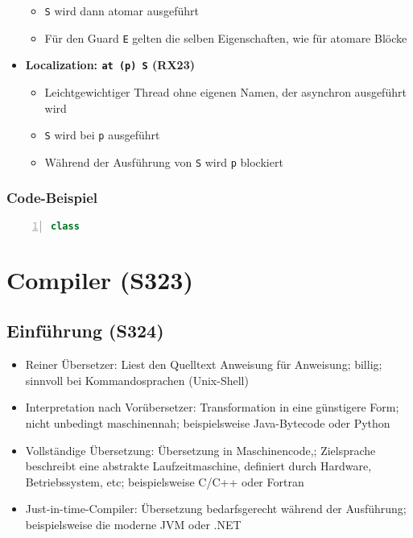 \begin{itemize}
\begin{itemize}
		\item \texttt{S} wird dann atomar ausgeführt
		\item Für den Guard \texttt{E} gelten die selben Eigenschaften, wie für atomare Blöcke
	\end{itemize}
	\item \textbf{Localization: \texttt{at (p) S} (RX23)}
	\begin{itemize}
		\item Leichtgewichtiger Thread ohne eigenen Namen, der asynchron ausgeführt wird
		\item \texttt{S} wird bei \texttt{p} ausgeführt
		\item Während der Ausführung von \texttt{S} wird \texttt{p} blockiert
	\end{itemize}
\end{itemize}

\subsubsection{Code-Beispiel}
\begin{lstlisting}[frame=single,numbers=left,mathescape,language=Java]
class 
\end{lstlisting}


\section{Compiler (S323)}

\subsection{Einführung (S324)}
\begin{itemize}
	\item Reiner Übersetzer: Liest den Quelltext Anweisung für Anweisung; billig; sinnvoll bei Kommandosprachen (Unix-Shell)
	\item Interpretation nach Vorübersetzer: Transformation in eine günstigere Form; nicht unbedingt maschinennah; beispielsweise Java-Bytecode oder Python
	\item Vollständige Übersetzung: Übersetzung in Maschinencode,; Zielsprache beschreibt eine abstrakte Laufzeitmaschine, definiert durch Hardware, Betriebssystem, etc; beispielsweise C/C++ oder Fortran
	\item Just-in-time-Compiler: Übersetzung bedarfsgerecht während der Ausführung; beispielsweise die moderne JVM oder .NET
\end{itemize}


